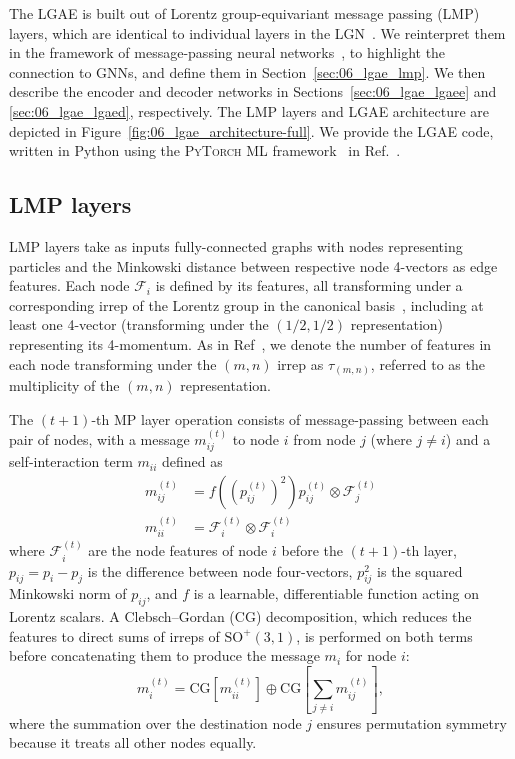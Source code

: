 The LGAE is built out of Lorentz group-equivariant message passing (LMP) layers, which are identical to individual layers in the LGN~\cite{bogatskiy2020lorentz}.
We reinterpret them in the framework of message-passing neural networks~\cite{gilmer2017neural}, to highlight the connection to GNNs, and define them in Section~\ref{sec:06_lgae_lmp}.
We then describe the encoder and decoder networks in Sections~\ref{sec:06_lgae_lgaee} and \ref{sec:06_lgae_lgaed}, respectively.
The LMP layers and LGAE architecture are depicted in Figure~\ref{fig:06_lgae_architecture-full}.
We provide the LGAE code, written in Python using the \textsc{PyTorch} ML framework~\cite{pytorch} in Ref.~\cite{LGAE_code}.

\subsection{LMP layers \label{sec:06_lgae_lmp}}

LMP layers take as inputs fully-connected graphs with nodes representing particles and the Minkowski distance between respective node 4-vectors as edge features.
Each node $\mathcal{F}_i$ is defined by its features, all transforming under a corresponding irrep of the Lorentz group in the canonical basis~\cite{gelfand2018representations}, including at least one 4-vector (transforming under the $(1/2, 1/2)$ representation) representing its 4-momentum.
As in Ref~\cite{bogatskiy2020lorentz}, we denote the number of features in each node transforming under the $(m, n)$ irrep as $\tau_{(m,n)}$, referred to as the multiplicity of the $(m,n)$ representation.

The $(t+1)$-th MP layer operation consists of message-passing between each pair of nodes, with a message $m_{i j}^{(t)}$ to node $i$ from node $j$ (where $j \neq i$) and a self-interaction term $m_{ii}$ defined as
\begin{align} \label{eq:06_lgae_msg}
        m_{i j}^{(t)} &= f\left( \left(p_{ij}^{(t)}\right)^2 \right) p_{ij}^{(t)} \otimes \mathcal{F}_j^{(t)} \\
        m_{i i}^{(t)} &= \mathcal{F}_i^{(t)} \otimes \mathcal{F}_i^{(t)}
\end{align}
where $\mathcal{F}_{i}^{(t)}$ are the node features of node $i$ before the $(t+1)$-th layer, $p_{ij} = p_i - p_j$ is the difference between node four-vectors, $p_{ij}^2$ is the squared Minkowski norm of $p_{i j}$, and $f$ is a learnable, differentiable function acting on Lorentz scalars.
A Clebsch--Gordan (CG) decomposition, which reduces the features to direct sums of irreps of $\mathrm{SO}^+(3,1)$, is performed on both terms before concatenating them to produce the message $m_i$ for node $i$:
\begin{equation}
    m_i^{(t)} =
    \mathrm{CG}\left[
    m_{i i}^{(t)}
    \right]
    \oplus
    \mathrm{CG}\left[
    \sum_{j\neq i} m_{i j}^{(t)}
    \right],
\end{equation}
where the summation over the destination node $j$ ensures permutation symmetry because it treats all other nodes equally.

